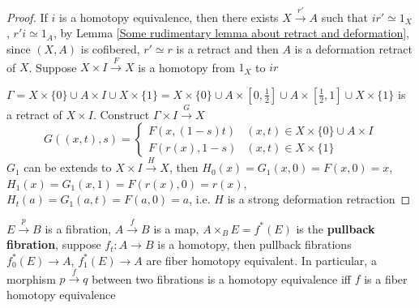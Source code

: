 \documentclass[main]{subfiles}
\begin{document}
\begin{proof}
If $i$ is a homotopy equivalence, then there exists $X\xrightarrow {r'}A$ such that $ir'\simeq1_X$, $r'i\simeq1_A$, by Lemma \ref{Some rudimentary lemma about retract and deformation}, since $(X,A)$ is cofibered, $r'\simeq r$ is a retract and then $A$ is a deformation retract of $X$. Suppose $X\times I\xrightarrow FX$ is a homotopy from $1_X$ to $ir$ \par
$\Gamma=X\times\{0\}\cup A\times I\cup X\times\{1\}=X\times\{0\}\cup A\times[0,\frac{1}{2}]\cup A\times [\frac{1}{2},1]\cup X\times\{1\}$ is a retract of $X\times I$. Construct $\Gamma\times I\xrightarrow GX$
\[G((x,t),s)=\begin{cases}
F(x,(1-s)t) &(x,t)\in X\times\{0\}\cup A\times I \\
F(r(x),1-s) &(x,t)\in X\times\{1\}
\end{cases}\]
$G_1$ can be extends to $X\times I\xrightarrow HX$, then $H_0(x)=G_1(x,0)=F(x,0)=x$, $H_1(x)=G_1(x,1)=F(r(x),0)=r(x)$, $H_t(a)=G_1(a,t)=F(a,0)=a$, i.e. $H$ is a strong deformation retraction
\end{proof}

\begin{lemma}\label{fibration map is a homotopy equivalence iff it is a fiber homotopy equivalence}
$E\xrightarrow{p}B$ is a fibration, $A\xrightarrow{f} B$ is a map, $A\times_B E=f^*(E)$ is the \textbf{pullback fibration}, suppose $f_t:A\to B$ is a homotopy, then pullback fibrations $f_0^*(E)\to A$, $f_1^*(E)\to A$ are fiber homotopy equivalent. In particular, a morphism $p\xrightarrow{f}q$ between two fibrations is a homotopy equivalence iff $f$ is a fiber homotopy equivalence
\end{lemma}
\end{document}
